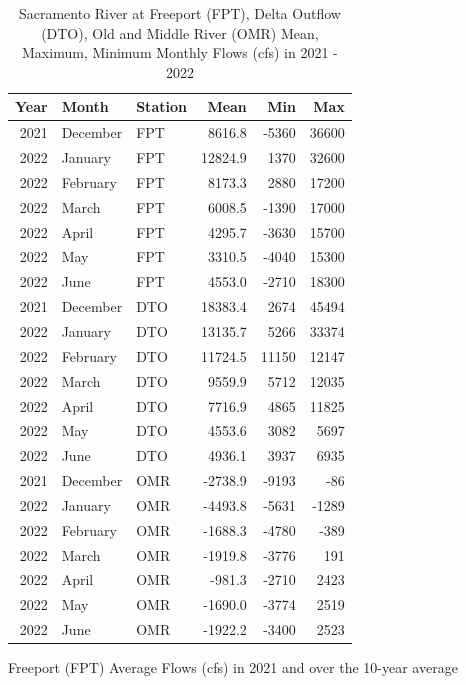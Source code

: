 \documentclass[
]{book}
\theoremstyle{definition}
\theoremstyle{definition}
\theoremstyle{definition}
\theoremstyle{definition}
\theoremstyle{remark}
\begin{document}
\begin{table}
\centering
\caption{Sacramento River at Freeport (FPT), Delta Outflow (DTO), Old and Middle River (OMR) Mean, Maximum, Minimum Monthly Flows (cfs) in 2021 - 2022}
\centering
\begin{tabular}[t]{rllrrr}
\hline
Year & Month & Station & Mean & Min & Max\\
\hline
2021 & December & FPT & 8616.8 & -5360 & 36600\\
\hline
2022 & January & FPT & 12824.9 & 1370 & 32600\\
\hline
2022 & February & FPT & 8173.3 & 2880 & 17200\\
\hline
2022 & March & FPT & 6008.5 & -1390 & 17000\\
\hline
2022 & April & FPT & 4295.7 & -3630 & 15700\\
\hline
2022 & May & FPT & 3310.5 & -4040 & 15300\\
\hline
2022 & June & FPT & 4553.0 & -2710 & 18300\\
\hline
2021 & December & DTO & 18383.4 & 2674 & 45494\\
\hline
2022 & January & DTO & 13135.7 & 5266 & 33374\\
\hline
2022 & February & DTO & 11724.5 & 11150 & 12147\\
\hline
2022 & March & DTO & 9559.9 & 5712 & 12035\\
\hline
2022 & April & DTO & 7716.9 & 4865 & 11825\\
\hline
2022 & May & DTO & 4553.6 & 3082 & 5697\\
\hline
2022 & June & DTO & 4936.1 & 3937 & 6935\\
\hline
2021 & December & OMR & -2738.9 & -9193 & -86\\
\hline
2022 & January & OMR & -4493.8 & -5631 & -1289\\
\hline
2022 & February & OMR & -1688.3 & -4780 & -389\\
\hline
2022 & March & OMR & -1919.8 & -3776 & 191\\
\hline
2022 & April & OMR & -981.3 & -2710 & 2423\\
\hline
2022 & May & OMR & -1690.0 & -3774 & 2519\\
\hline
2022 & June & OMR & -1922.2 & -3400 & 2523\\
\hline
\end{tabular}
\end{table}

\label{fig:FPTflow-fig}Freeport (FPT) Average Flows (cfs) in 2021 and over the 10-year average
\end{document}
